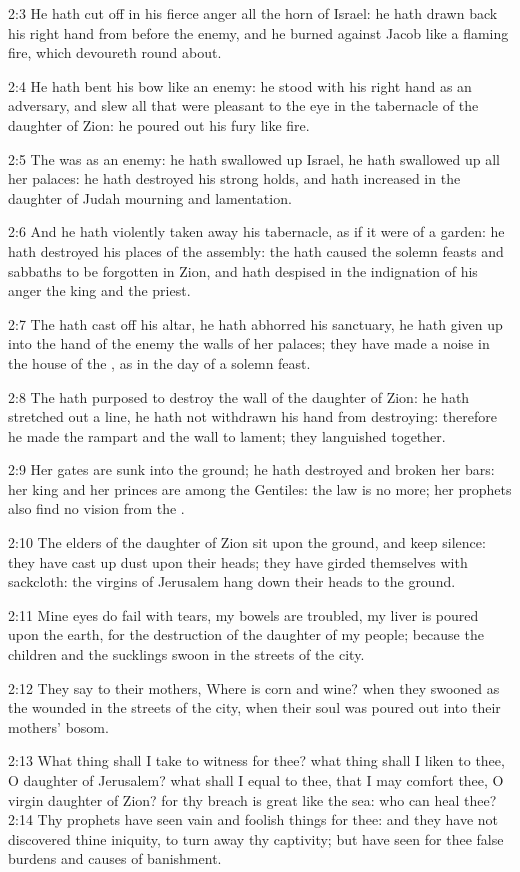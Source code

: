 2:3 He hath cut off in his fierce anger all the horn of Israel: he hath drawn back his right hand from before the enemy, and he burned against Jacob like a flaming fire, which devoureth round about.

2:4 He hath bent his bow like an enemy: he stood with his right hand as an adversary, and slew all that were pleasant to the eye in the tabernacle of the daughter of Zion: he poured out his fury like fire.

2:5 The \LORD was as an enemy: he hath swallowed up Israel, he hath swallowed up all her palaces: he hath destroyed his strong holds, and hath increased in the daughter of Judah mourning and lamentation.

2:6 And he hath violently taken away his tabernacle, as if it were of a garden: he hath destroyed his places of the assembly: the \LORD hath caused the solemn feasts and sabbaths to be forgotten in Zion, and hath despised in the indignation of his anger the king and the priest.

2:7 The \LORD hath cast off his altar, he hath abhorred his sanctuary, he hath given up into the hand of the enemy the walls of her palaces; they have made a noise in the house of the \LORD, as in the day of a solemn feast.

2:8 The \LORD hath purposed to destroy the wall of the daughter of Zion: he hath stretched out a line, he hath not withdrawn his hand from destroying: therefore he made the rampart and the wall to lament; they languished together.

2:9 Her gates are sunk into the ground; he hath destroyed and broken her bars: her king and her princes are among the Gentiles: the law is no more; her prophets also find no vision from the \LORD.

2:10 The elders of the daughter of Zion sit upon the ground, and keep silence: they have cast up dust upon their heads; they have girded themselves with sackcloth: the virgins of Jerusalem hang down their heads to the ground.

2:11 Mine eyes do fail with tears, my bowels are troubled, my liver is poured upon the earth, for the destruction of the daughter of my people; because the children and the sucklings swoon in the streets of the city.

2:12 They say to their mothers, Where is corn and wine? when they swooned as the wounded in the streets of the city, when their soul was poured out into their mothers' bosom.

2:13 What thing shall I take to witness for thee? what thing shall I liken to thee, O daughter of Jerusalem? what shall I equal to thee, that I may comfort thee, O virgin daughter of Zion? for thy breach is great like the sea: who can heal thee?  2:14 Thy prophets have seen vain and foolish things for thee: and they have not discovered thine iniquity, to turn away thy captivity; but have seen for thee false burdens and causes of banishment.

